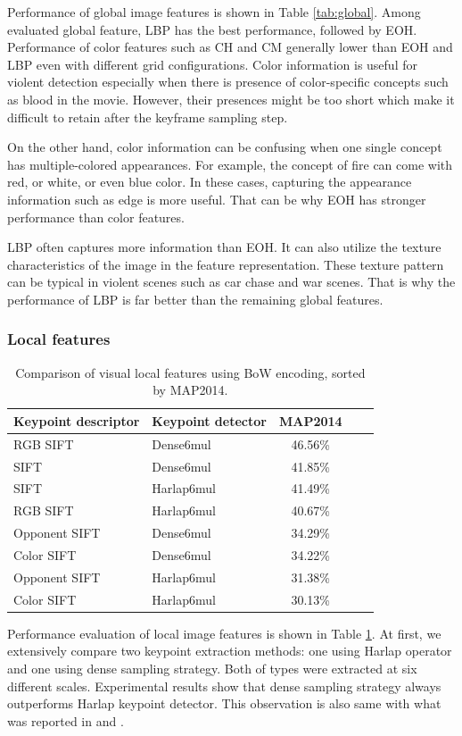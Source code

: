 \documentclass[twocolumn]{bmcart}%
\begin{document}
Performance of global image features is shown in Table \ref{tab:global}. Among evaluated global feature, LBP has the best performance, followed by EOH. Performance of color features such as CH and CM generally lower than EOH and LBP even with different grid configurations. Color information is useful for violent detection especially when there is presence of color-specific concepts such as blood in the movie. However, their presences might be too short which make it difficult to retain after the keyframe sampling step.

On the other hand, color information can be confusing when one single concept has multiple-colored appearances. For example, the concept of fire can come with red, or white, or even blue color. In these cases, capturing the appearance information such as edge is more useful. That can be why EOH has stronger performance than color features. 

LBP often captures more information than EOH. It can also utilize the texture characteristics of the image in the feature representation. These texture pattern can be typical in violent scenes such as car chase and war scenes. That is why the performance of LBP is far better than the remaining global features.
\subsubsection{Local features}

\begin{table}
	\centering
	\caption{Comparison of visual local features using BoW encoding, sorted by MAP2014.}
	\begin{tabular}{llccc}
		\hline
		Keypoint descriptor & Keypoint detector & MAP2014 \\ \hline
		RGB SIFT & Dense6mul & 46.56\% \\
		SIFT  & Dense6mul & 41.85\% \\
		SIFT  & Harlap6mul & 41.49\% \\
		RGB SIFT & Harlap6mul & 40.67\% \\
		Opponent SIFT & Dense6mul  & 34.29\% \\
		Color SIFT & Dense6mul  & 34.22\% \\
		Opponent SIFT & Harlap6mul & 31.38\% \\
		Color SIFT & Harlap6mul & 30.13\% \\
	\end{tabular}%
	\label{tab:local}%
\end{table}%
Performance evaluation of local image features is shown in Table \ref{tab:local}. At first, we extensively compare two keypoint extraction methods: one using Harlap operator and one using dense sampling strategy. Both of types were extracted at six different scales. Experimental results show that dense sampling strategy always outperforms Harlap keypoint detector. This observation is also same with what was reported in \cite{bosch2006scene} and \cite{bosch2007image}.
\end{document}
